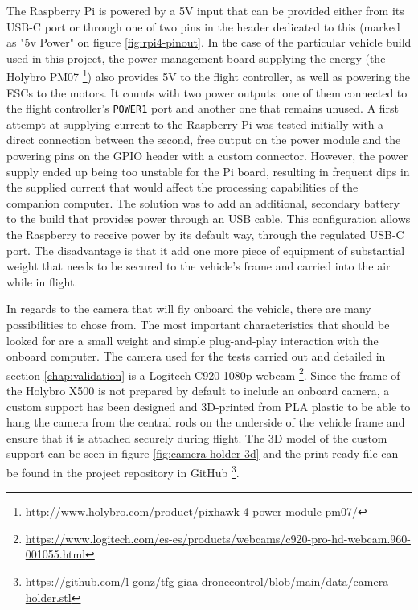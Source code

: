 The Raspberry Pi is powered by a 5V input that can be provided either from its USB-C port or through one of two pins in the header dedicated to this (marked as "5v Power" on figure \ref{fig:rpi4-pinout}.
In the case of the particular vehicle build used in this project, the power management board supplying the energy (the Holybro PM07 \footnote{\url{http://www.holybro.com/product/pixhawk-4-power-module-pm07/}}) also provides 5V to the flight controller, as well as powering the ESCs to the motors.
It counts with two power outputs: one of them connected to the flight controller's \texttt{POWER1} port and another one that remains unused.
A first attempt at supplying current to the Raspberry Pi was tested initially with a direct connection between the second, free output on the power module and the powering pins on the GPIO header with a custom connector.
However, the power supply ended up being too unstable for the Pi board, resulting in frequent dips in the supplied current that would affect the processing capabilities of the companion computer.
The solution was to add an additional, secondary battery to the build that provides power through an USB cable.
This configuration allows the Raspberry to receive power by its default way, through the regulated USB-C port.
The disadvantage is that it add one more piece of equipment of substantial weight that needs to be secured to the vehicle's frame and carried into the air while in flight.


In regards to the camera that will fly onboard the vehicle, there are many possibilities to chose from.
The most important characteristics that should be looked for are a small weight and simple plug-and-play interaction with the onboard computer.
The camera used for the tests carried out and detailed in section \ref{chap:validation} is a Logitech C920 1080p webcam \footnote{\url{https://www.logitech.com/es-es/products/webcams/c920-pro-hd-webcam.960-001055.html}}.
Since the frame of the Holybro X500 is not prepared by default to include an onboard camera,
a custom support has been designed and 3D-printed from PLA plastic to be able to hang the camera from the central rods on the underside of the vehicle frame and ensure that it is attached securely during flight.
The 3D model of the custom support can be seen in figure \ref{fig:camera-holder-3d} and the print-ready file can be found in the project repository in GitHub \footnote{\url{https://github.com/l-gonz/tfg-giaa-dronecontrol/blob/main/data/camera-holder.stl}}.

